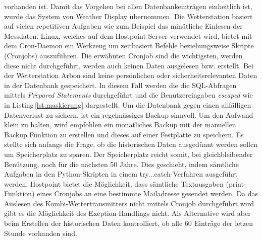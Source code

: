 \documentclass[11pt]{article}
\begin{document}
\begin{multicols}{2}
vorhanden ist. Damit das Vorgehen bei allen Datenbankeinträgen einheitlich ist, wurde das System von Weather Display übernommen. Die Wetterstation basiert auf vielen repetitiven Aufgaben wie zum Beispiel das minütliche Einlesen der Messdaten. Linux, welches auf dem Hostpoint-Server verwendet wird, bietet mit dem Cron-Daemon ein Werkzeug um zeitbasiert Befehle beziehungsweise Skripte (Cronjobs) auszuführen. Die erwähnten Cronjob sind die wichtigsten, werden diese nicht durchgeführt, werden auch keinen Daten ausgelesen bzw. erstellt. Bei der Wetterstation Arbon sind keine persönlichen oder sicherheitsrelevanten Daten in der Datenbank gespeichert. In diesem Fall werden die
die SQL-Abfragen mittels \emph{Prepared Statements} durchgeführt und die Benutzereingaben \emph{escaped} wie in Listing\,\ref{lst:maskierung} dargestellt. Um die Datenbank gegen einen allfälligen Datenverlust zu sichern, ist ein regelmässiges Backup sinnvoll. Um den Aufwand klein zu halten, wird empfohlen ein monatliches Backup mit der manuellen Backup Funktion zu erstellen und dieses auf einer Festplatte zu speichern.  Es stellte sich anfangs die Frage, ob die historischen Daten ausgedünnt werden sollen um Speicherplatz zu sparen. Der Speicherplatz reicht somit, bei gleichbleibender Benützung, noch für die nächsten 50 Jahre.  Dies geschieht, indem sämtliche Aufgaben in den Python-Skripten in einem try...catch-Verfahren ausgeführt werden.  Hostpoint bietet die Möglichkeit, dass sämtliche Textausgaben (print-Funktion) eines Cronjobs an eine bestimmte Mailadresse gesendet werden. Da das Auslesen des Kombi-Wettertransmitters nicht mittels Cronjob durchgeführt wird gibt es die Möglichkeit des Exeption-Handlings nicht. Als Alternative wird aber beim Erstellen der historischen Daten kontrolliert, ob alle 60 Einträge der letzen Stunde vorhanden sind.

\end{multicols}
 
\end{document}
